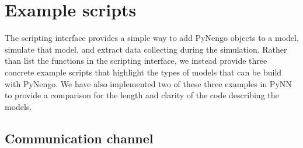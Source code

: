 \documentclass{frontiersSCNS}
\begin{document}
\section{Example scripts} \label{sec:examples}

The scripting interface provides
a simple way to add PyNengo objects to a model,
simulate that model,
and extract data collecting during the simulation.
Rather than list the functions in the scripting interface,
we instead provide three concrete example scripts
that highlight the types of models that can be
build with PyNengo.
We have also implemented two of these three examples
in PyNN to provide a comparison
for the length and clarity of the code
describing the models.

\subsection{Communication channel} \label{sec:comm-channel}
\end{document}
